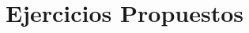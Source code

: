 \documentclass[aspectratio=169]{beamer}
\begin{document}

\section{Ejercicios Propuestos}
\end{document}
